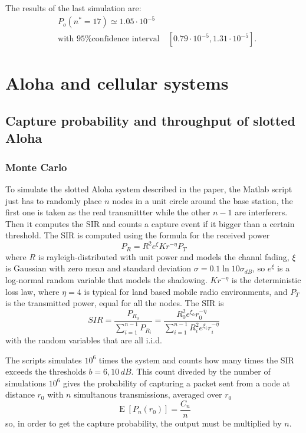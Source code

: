 \documentclass[a4paper,oneside]{article}
\renewcommand{\approx}[0]{\simeq}
\newcommand{\E}[1]{\operatorname{E}\left[#1\right]}
\begin{document}
The results of the last simulation are:
\begin{align*}
  & P_o(n^* = 17) \approx 1.05 \cdot 10^{-5} \\
  & \text{with 95\% confidence interval} \quad [0.79 \cdot 10^{-5}, 1.31 \cdot 10^{-5}] .
\end{align*}
\section{Aloha and cellular systems}
\subsection*{Capture probability and throughput of slotted Aloha}
\subsubsection*{Monte Carlo}
To simulate the slotted Aloha system described in the paper, the
Matlab script just has to randomly place $n$ nodes in a unit circle
around the base station, the first one is taken as the real
transmittter while the other $n-1$ are interferers. Then it computes
the SIR and counts a capture event if it bigger than a certain
threshold.
%
The SIR is computed using the formula for the received power
\begin{equation}
  P_R = R^2e^\xi Kr^{-\eta}P_T
\end{equation}
where $R$ is rayleigh-distributed with unit power and models the
channl fading, $\xi$ is Gaussian with zero mean and standard deviation
$\sigma = 0.1 \ln10 \sigma_{dB}$, so $e^\xi$ is a log-normal random
variable that models the shadowing. $Kr^{-\eta}$ is the deterministic
loss law, where $\eta = 4$ is typical for land based mobile radio
environments, and $P_T$ is the transmitted power, equal for all the
nodes.
%
The SIR is
\begin{equation}
  SIR = \frac{P_{R_0}}{\sum_{i=1}^{n-1} P_{R_i}} =
  \frac{R_0^2 e^{\xi_0} r_0^{-\eta}}{\sum_{i=1}^{n-1} R_i^2 e^{\xi_i} r_i^{-\eta}}
  \label{eq:SIR}
\end{equation}
with the random variables that are all i.i.d.

The scripts simulates $10^6$ times the system and counts how many
times the SIR exceeds the thresholds $b = 6, 10 \, \si{dB}$. This count
diveded by the number of simulations $10^6$ gives the probability of
capturing a packet sent from a node at distance $r_0$ with $n$
simultanous transmissions, averaged over $r_0$
\begin{equation}
  \E{P_n(r_0)} = \frac{C_n}{n}
\end{equation}
so, in order to get the capture probability, the output must be
multiplied by $n$.
\end{document}
